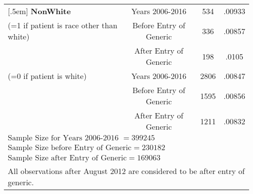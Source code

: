 \begin{table}[htbp]
\begin{tabular}{l*{3}{c}}
[.5em]
\textbf{NonWhite}                                       &     Years 2006-2016&             534&      .00933\\
(=1 if patient is race other than white)                &     Before Entry of Generic&     336&      .00857\\
                                                        &     After Entry of Generic&      198&      .0105\\
[.5em]
(=0 if patient is white)                                &     Years 2006-2016&             2806&      .00847\\
                                                        &     Before Entry of Generic&     1595&      .00856\\
                                                        &     After Entry of Generic&      1211&      .00832\\
\hline
\multicolumn{4}{l}{$\text{Sample Size for Years 2006-2016 }= 399245$}\\
\multicolumn{4}{l}{$\text{Sample Size before Entry of Generic} = 230182$}\\
\multicolumn{4}{l}{$\text{Sample Size after Entry of Generic} = 169063$}\\
\hline\hline
\multicolumn{4}{l}{\footnotesize All observations after August 2012 are considered to be after entry of generic.}\\
\end{tabular}



\label{tab:Table4.4}
\end{table}

